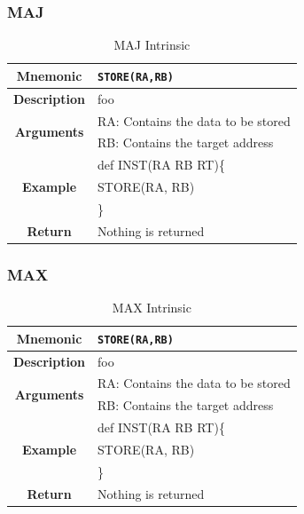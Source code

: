 \documentclass{article}
\begin{document}
\clearpage
\subsubsection{MAJ}
\label{sec:MAJ}

\begin{table}[h]
\begin{center}
\caption{MAJ Intrinsic}
\vspace{0.125in}
\label{tab:MAJIntrinsic}
\begin{tabular}{|c|l|}
\hline
\textbf{Mnemonic} & \texttt{STORE(RA,RB)}\\
\hline
\textbf{Description} & foo\\
\hline
\multirow{2}{*}{\textbf{Arguments}} & RA: Contains the data to be stored\\
                          			     & RB: Contains the target address \\
\hline
\multirow{3}{*}{\textbf{Example}} & def INST(RA RB RT)\{\\
                          			  &   STORE(RA, RB)\\
                                                    & \}\\
\hline
\textbf{Return} & Nothing is returned\\                                                    
\hline
\end{tabular}
\end{center}
\end{table}

\clearpage
\subsubsection{MAX}
\label{sec:MAX}

\begin{table}[h]
\begin{center}
\caption{MAX Intrinsic}
\vspace{0.125in}
\label{tab:MAXIntrinsic}
\begin{tabular}{|c|l|}
\hline
\textbf{Mnemonic} & \texttt{STORE(RA,RB)}\\
\hline
\textbf{Description} & foo\\
\hline
\multirow{2}{*}{\textbf{Arguments}} & RA: Contains the data to be stored\\
                          			     & RB: Contains the target address \\
\hline
\multirow{3}{*}{\textbf{Example}} & def INST(RA RB RT)\{\\
                          			  &   STORE(RA, RB)\\
                                                    & \}\\
\hline
\textbf{Return} & Nothing is returned\\                                                    
\hline
\end{tabular}
\end{center}
\end{table}
\end{document}
